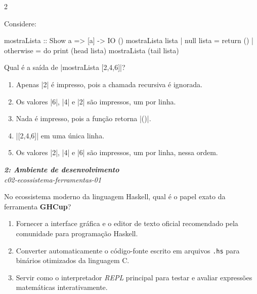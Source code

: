 \documentclass[a4paper,10pt,brazil]{article}
\begin{document}
\begin{multicols}{2}
\begin{flushright}
\end{flushright}
Considere:

\begin{haskellcode}
mostraLista :: Show a => [a] -> IO ()
mostraLista lista
  | null lista = return ()
  | otherwise = do
      print (head lista)
      mostraLista (tail lista)
\end{haskellcode}

Qual é a saída de \haskellinline|mostraLista [2,4,6]|?

\begin{enumerate}
  \item Apenas \haskellinline|2| é impresso, pois a chamada recursiva é ignorada.

  \item Os valores \haskellinline|6|, \haskellinline|4| e \haskellinline|2| são impressos, um por linha.

  \item Nada é impresso, pois a função retorna \haskellinline|()|.

  \item \haskellinline|[2,4,6]| em uma única linha.

  \item Os valores \haskellinline|2|, \haskellinline|4| e \haskellinline|6| são impressos, um por linha, nessa ordem.


\end{enumerate}

\begin{flushright}
  \footnotesize
  \textit{\textbf{2: Ambiente de desenvolvimento}}\\
  \textit{c02-ecossistema-ferramentas-01}\\

\end{flushright}
No ecossistema moderno da linguagem Haskell, qual é o papel exato da ferramenta \textbf{GHCup}?

\begin{enumerate}
  \item Fornecer a interface gráfica e o editor de texto oficial recomendado pela comunidade para programação Haskell.

  \item Converter automaticamente o código-fonte escrito em arquivos \texttt{.hs} para binários otimizados da linguagem C.

  \item Servir como o interpretador \emph{REPL} principal para testar e avaliar expressões matemáticas interativamente.


\end{enumerate}
\end{multicols}
\end{document}
